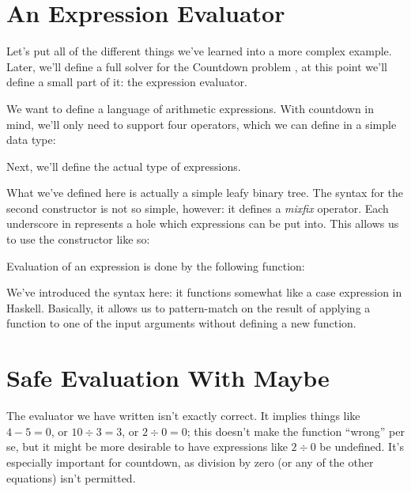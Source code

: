 \section{An Expression Evaluator}
Let's put all of the different things we've learned into a more complex example.
Later, we'll define a full solver for the Countdown problem
\citep{huttonCountdownProblem2002} , at this
point we'll define a small part of it: the expression evaluator.

We want to define a language of arithmetic expressions.
With countdown in mind, we'll only need to support four operators, which we can
define in a simple data type:
\begin{agdalisting}
\end{agdalisting}
Next, we'll define the actual type of expressions.
\begin{agdalisting}
\end{agdalisting}
What we've defined here is actually a simple leafy binary tree.
The syntax for the second constructor is not so simple, however: it defines a
\emph{mixfix} operator.
Each underscore in \AgdaInductiveConstructor{\(\_\langle \_ \rangle\_\)}
represents a hole which expressions can be put into.
This allows us to use the constructor like so:
\begin{agdalisting*}
\end{agdalisting*}

Evaluation of an expression is done by the following function:
\begin{agdalisting}
\end{agdalisting}
We've introduced the  syntax here: it functions somewhat like
a case expression in Haskell.
Basically, it allows us to pattern-match on the result of applying a function to
one of the input arguments without defining a new function.
\section{Safe Evaluation With Maybe}
The evaluator we have written isn't exactly correct.
It implies things like \(4 - 5 = 0\), or \(10 \div 3 = 3\), or \(2 \div 0 = 0\);
this doesn't make the function ``wrong'' per se, but it might be more desirable
to have expressions like \(2 \div 0\) be undefined.
It's especially important for countdown, as division by zero (or any of the
other equations) isn't permitted.

